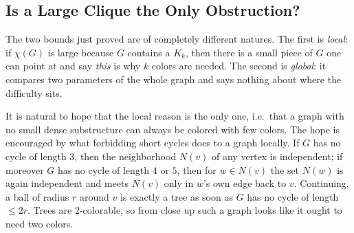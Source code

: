 
\subsection{Is a Large Clique the Only Obstruction?}

The two bounds just proved are of completely different natures. The first is \emph{local}: if \(\chi(G)\) is large because \(G\) contains a \(K_k\), then there is a small piece of \(G\) one can point at and say \emph{this} is why \(k\) colors are needed. The second is \emph{global}: it compares two parameters of the whole graph and says nothing about where the difficulty sits.

It is natural to hope that the local reason is the only one, i.e.\ that a graph with no small dense substructure can always be colored with few colors. The hope is encouraged by what forbidding short cycles does to a graph locally. If \(G\) has no cycle of length \(3\), then the neighborhood \(N(v)\) of any vertex is independent; if moreover \(G\) has no cycle of length \(4\) or \(5\), then for \(w \in N(v)\) the set \(N(w)\) is again independent and meets \(N(v)\) only in \(w\)'s own edge back to \(v\). Continuing, a ball of radius \(r\) around \(v\) is exactly a tree as soon as \(G\) has no cycle of length \(\le 2r\). Trees are \(2\)-colorable, so from close up such a graph looks like it ought to need two colors.

\begin{center}
\end{center}

